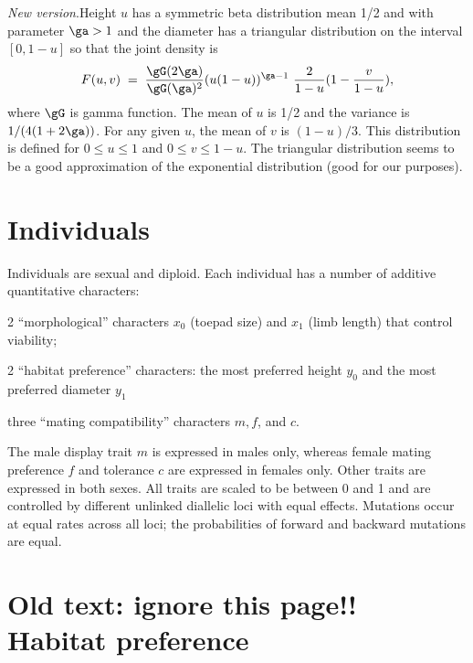 \documentclass{article}
\begin{document}
{\em New version}.\quad Height $u$ has a symmetric beta distribution mean 1/2
and with parameter
$\ga>1$ and the diameter has a triangular distribution on the interval $[0,1-u]$
so that the joint density is 
\begin{equation} \label{beta}
F(u,v) \; = \;
\frac{\gG(2\ga)}{\gG(\ga)^2} (u(1-u))^{\ga-1}\ \frac{2}{1-u}(1-\frac{v}{1-u}),
\end{equation}
where $\gG$ is gamma function. The mean of $u$ is 1/2 and the variance is $1/(4(1+2\ga))$.
For any given $u$, the mean of $v$ is $(1-u)/3$.
This distribution is defined for $0 \leq u \leq 1$ and $0 \leq v \leq 1-u$.
The triangular distribution seems to be a good approximation of the exponential
distribution (good for our purposes).

\section{Individuals}

Individuals are sexual and diploid. Each individual has a number of
additive quantitative characters: \bi
\item 2 ``morphological'' characters $x_0$ (toepad size) and $x_1$
  (limb length) that control viability;
\item 2 ``habitat preference'' characters: the most preferred height
  $y_0$ and the most preferred diameter $y_1$
\item three ``mating compatibility'' characters $m, f$, and $c$.
\ei

The male display trait $m$ is expressed in males only, whereas female
mating preference $f$ and tolerance $c$ are expressed in females
only. Other traits are expressed in both sexes.  All traits are scaled
to be between 0 and 1 and are controlled by different unlinked
diallelic loci with equal effects. Mutations occur at equal rates
across all loci; the probabilities of forward and backward mutations
are equal.


\newpage
\section{Old text: ignore this page!!\\ Habitat preference}
\end{document}
